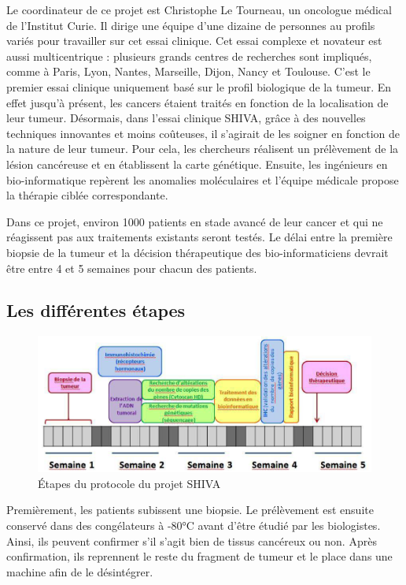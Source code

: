 \documentclass[12pt, openany]{report}
\begin{document}
Le coordinateur de ce projet est Christophe Le Tourneau, un oncologue médical de l’Institut Curie. Il dirige une équipe d’une dizaine de personnes au profils variés pour travailler sur cet essai clinique. Cet essai complexe et novateur est aussi multicentrique : plusieurs grands centres de recherches sont impliqués, comme à Paris, Lyon, Nantes, Marseille, Dijon, Nancy et Toulouse. C'est le premier essai clinique uniquement basé sur le profil biologique de la tumeur. En effet jusqu’à présent, les cancers étaient traités en fonction de la localisation de leur tumeur. Désormais, dans l’essai clinique SHIVA, grâce à des nouvelles techniques innovantes et moins coûteuses, il s’agirait de les soigner en fonction de la nature de leur tumeur. Pour cela, les chercheurs réalisent un prélèvement de la lésion cancéreuse et en établissent la carte génétique. Ensuite, les ingénieurs en bio-informatique repèrent les anomalies moléculaires et l’équipe médicale propose la thérapie ciblée correspondante.

Dans ce projet, environ 1000 patients en stade avancé de leur cancer et qui ne réagissent pas aux traitements existants seront testés. Le délai entre la première biopsie de la tumeur et la décision thérapeutique des bio-informaticiens devrait être entre 4 et 5 semaines pour chacun des patients.

\subsection{Les différentes étapes} 

 \begin{figure}[H]
\begin{center}
    \includegraphics[scale=1]{Images/im19.png}
\caption{\'Etapes du protocole du projet SHIVA}    
\end{center}
\end{figure}

Premièrement, les patients subissent une biopsie. Le prélèvement est ensuite conservé dans des congélateurs à -80°C avant d’être étudié par les biologistes. Ainsi, ils peuvent confirmer s'il s’agit bien de tissus cancéreux ou non. Après confirmation, ils reprennent le reste du fragment de tumeur et le place dans une machine afin de le désintégrer. 
\end{document}
